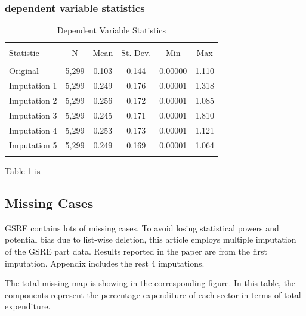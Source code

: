 \documentclass[12pt]{article}\usepackage[]{graphicx}\usepackage[]{color}
\begin{document}
\subsubsection{dependent variable statistics}



\begin{table}[!htbp] \centering 
  \caption{Dependent Variable Statistics} 
  \label{imp} 
\begin{tabular}{@{\extracolsep{5pt}}lccccc} 
\\[-1.8ex]\hline 
\hline \\[-1.8ex] 
Statistic & \multicolumn{1}{c}{N} & \multicolumn{1}{c}{Mean} & \multicolumn{1}{c}{St. Dev.} & \multicolumn{1}{c}{Min} & \multicolumn{1}{c}{Max} \\ 
\hline \\[-1.8ex] 
Original & 5,299 & 0.103 & 0.144 & 0.00000 & 1.110 \\ 
Imputation 1 & 5,299 & 0.249 & 0.176 & 0.00001 & 1.318 \\ 
Imputation 2 & 5,299 & 0.256 & 0.172 & 0.00001 & 1.085 \\ 
Imputation 3 & 5,299 & 0.245 & 0.171 & 0.00001 & 1.810 \\ 
Imputation 4 & 5,299 & 0.253 & 0.173 & 0.00001 & 1.121 \\ 
Imputation 5 & 5,299 & 0.249 & 0.169 & 0.00001 & 1.064 \\ 
\hline \\[-1.8ex] 
\end{tabular} 
\end{table} 


Table \ref{imp} is 

\subsection{Missing Cases}

GSRE contains lots of missing cases. To avoid losing statistical powers and potential bias due to list-wise deletion, this article employs multiple imputation of the GSRE part data. Results reported in the paper are from the first imputation. Appendix includes the rest 4 imputations. 

The total missing map is showing in the corresponding figure. In this table, the components represent the percentage expenditure of each sector in terms of total expenditure. 
\end{document}
